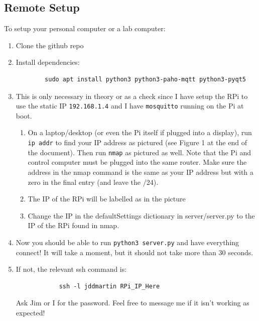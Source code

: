 \documentclass[11pt, letterpaper]{article}
\begin{document}
\subsection{Remote Setup}
To setup your personal computer or a lab computer:
\begin{enumerate}
    \item Clone the github repo
    \item Install dependencies:
    \begin{verbatim}
        sudo apt install python3 python3-paho-mqtt python3-pyqt5
    \end{verbatim}
    \item This is only necessary in theory or as a check since I have setup the RPi to use the static IP \verb|192.168.1.4| and I have \verb|mosquitto| running on the Pi at boot.
    \begin{enumerate}
        \item On a laptop/desktop (or even the Pi itself if plugged into a display), run \verb|ip addr| to find your IP address as pictured (see Figure 1 at the end of the document). Then run \verb|nmap| as pictured as well. Note that the Pi and control computer must be plugged into the same router. Make sure the address in the nmap command is the same as your IP address but with a zero in the final entry (and leave the /24).
        \item The IP of the RPi will be labelled as in the picture
        \item Change the IP in the defaultSettings dictionary in server/server.py to the IP of the RPi found in nmap.
    \end{enumerate}
    \item Now you should be able to run \verb|python3 server.py| and have everything connect! It will take a moment, but it should not take more than 30 seconds.
    \item If not, the relevant ssh command is:
        \begin{verbatim}
            ssh -l jddmartin RPi_IP_Here 
        \end{verbatim}
    Ask Jim or I for the password. Feel free to message me if it isn't working as expected!

\end{enumerate}
\newpage
\end{document}
